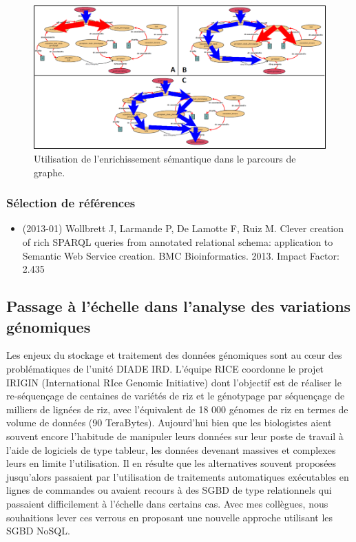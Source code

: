 \begin{figure}[!ht]
\begin{center}
	\includegraphics[width=1\textwidth]{Figures/biosemantic4.png}
\end{center}
\label{parcours}
\caption{Utilisation de l'enrichissement sémantique dans le parcours de graphe.}
\end{figure}

\subsubsection*{Sélection de références}

\begin{itemize}

\item (2013-01) Wollbrett J, Larmande P, De Lamotte F, Ruiz M. Clever creation of rich SPARQL queries from annotated relational schema: application to Semantic Web Service creation. BMC Bioinformatics. 2013. Impact Factor: 2.435
\end{itemize}

\subsection*{Passage à l’échelle dans l’analyse des variations génomiques}
\label{GIGWA}

Les enjeux du stockage et traitement des données génomiques sont au  c\oe ur des problématiques de l’unité DIADE IRD. L’équipe RICE coordonne le projet IRIGIN (International RIce Genomic Initiative) dont l’objectif est de réaliser le re-séquençage de centaines de variétés de riz et le génotypage par séquençage de milliers de lignées de riz, avec l’équivalent de 18 000 génomes de riz en termes de volume de données (90 TeraBytes). Aujourd'hui bien que les biologistes aient souvent encore l'habitude de manipuler leurs données sur leur poste de travail à l'aide de logiciels de type tableur, les données devenant massives et complexes leurs en limite l'utilisation. Il en résulte que les alternatives souvent proposées  jusqu'alors passaient par l’utilisation de traitements automatiques exécutables en lignes de commandes ou avaient recours à des SGBD de type relationnels qui passaient difficilement à l'échelle dans certains cas.  Avec mes collègues, nous souhaitions lever ces verrous en proposant une nouvelle approche utilisant les SGBD NoSQL.

